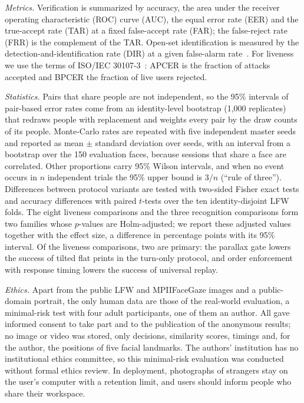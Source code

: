 \documentclass{ieeeaccess}
\begin{document}
\emph{Metrics.} Verification is summarized by accuracy, the area under the receiver operating characteristic (ROC) curve (AUC), the equal error rate (EER) and the true-accept rate (TAR) at a fixed false-accept rate (FAR); the false-reject rate (FRR) is the complement of the TAR. Open-set identification is measured by the detection-and-identification rate (DIR) at a given false-alarm rate~\cite{gunther2017openset}. For liveness we use the terms of ISO/IEC 30107-3~\cite{iso30107-3}: APCER is the fraction of attacks accepted and BPCER the fraction of live users rejected.

\emph{Statistics.} Pairs that share people are not independent, so the 95\% intervals of pair-based error rates come from an identity-level bootstrap (1,000 replicates) that redraws people with replacement and weights every pair by the draw counts of its people. Monte-Carlo rates are repeated with five independent master seeds and reported as mean $\pm$ standard deviation over seeds, with an interval from a bootstrap over the 150 evaluation faces, because sessions that share a face are correlated. Other proportions carry 95\% Wilson intervals, and when no event occurs in $n$ independent trials the 95\% upper bound is $3/n$ (``rule of three''). Differences between protocol variants are tested with two-sided Fisher exact tests and accuracy differences with paired $t$-tests over the ten identity-disjoint LFW folds. The eight liveness comparisons and the three recognition comparisons form two families whose $p$-values are Holm-adjusted; we report these adjusted values together with the effect size, a difference in percentage points with its 95\% interval. Of the liveness comparisons, two are primary: the parallax gate lowers the success of tilted flat prints in the turn-only protocol, and order enforcement with response timing lowers the success of universal replay.

\emph{Ethics.} Apart from the public LFW and MPIIFaceGaze images and a public-domain portrait, the only human data are those of the real-world evaluation, a minimal-risk test with four adult participants, one of them an author. All gave informed consent to take part and to the publication of the anonymous results; no image or video was stored, only decisions, similarity scores, timings and, for the author, the positions of five facial landmarks. The authors' institution has no institutional ethics committee, so this minimal-risk evaluation was conducted without formal ethics review. In deployment, photographs of strangers stay on the user's computer with a retention limit, and users should inform people who share their workspace.
\end{document}
